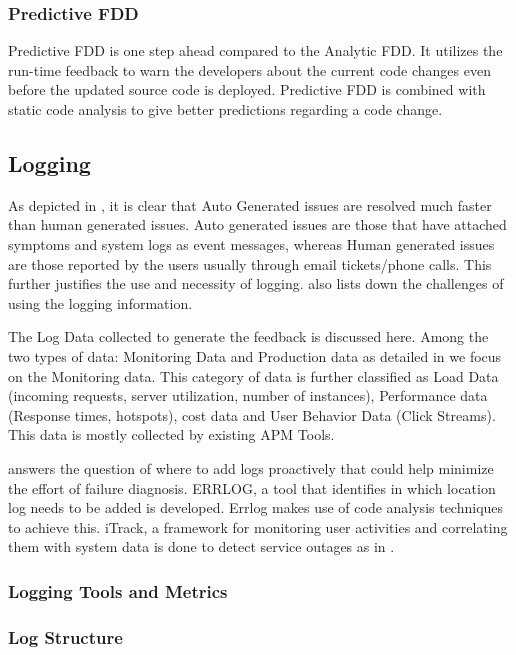 \documentclass[article,type=msc,colorback,12pt,accentcolor=tud7b]{tudthesis}
\begin{document}
	\subsubsection{Predictive FDD}
Predictive FDD is one step ahead compared to the Analytic FDD. It utilizes the run-time feedback to warn the developers about the current code changes even before the updated source code is deployed. Predictive FDD is combined with static code analysis to give better predictions regarding a code change. 


 		
	\subsection{Logging}
		
		As depicted in \cite{jiang2009understanding} , it is clear that Auto Generated issues are resolved much faster than human generated issues. Auto generated issues are those that have attached symptoms and system logs as event messages, whereas Human generated issues are those reported by the users usually through email tickets/phone calls. This further justifies the use and necessity of logging. \cite{jiang2009understanding} also lists down the challenges of using the logging information.
		
		The Log Data collected to generate the feedback is discussed here. Among the two types of data: Monitoring Data and Production data as detailed in \cite{cito2015runtime} we focus on the Monitoring data. This category of data is further classified as Load Data (incoming requests, server utilization, number of instances), Performance data (Response times, hotspots), cost data and User Behavior Data (Click Streams). This data is mostly collected by existing APM Tools.
		
		\cite{yuan2012conservative} answers the question of where to add logs proactively that could help minimize the effort of failure diagnosis. ERRLOG, a tool that identifies in which location log needs to be added is developed. Errlog makes use of code analysis techniques to achieve this. iTrack, a framework for monitoring user activities and correlating them with system data is done to detect service outages as in \cite{mann2011correlating}. 
			
	\subsubsection{Logging Tools and Metrics}	

		\subsubsection{Log Structure}	
		
\end{document}
